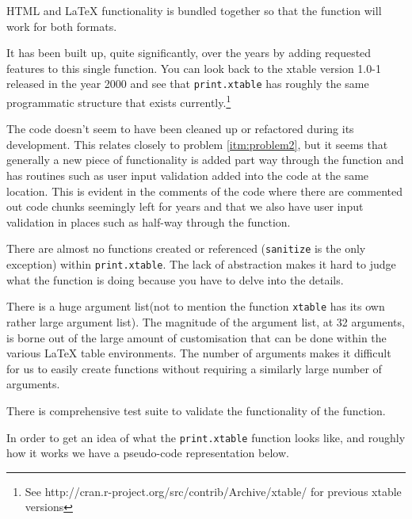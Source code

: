 \documentclass{memoir}\usepackage[]{graphicx}\usepackage[]{color}
\makeatletter
\def\namedlabel#1#2{\begingroup
    #2%
    \def\@currentlabel{#2}%
    \phantomsection\label{#1}\endgroup
}
\newcommand{\pkg}[1]{{\fontseries{b}\selectfont #1}}
\let\code=\texttt
\newcommand{\latex}{\LaTeX\xspace}
\makeatother
\begin{document}
\begin{description}[style=multiline, labelwidth=0.5cm]
    \item[\namedlabel{itm:problem1}{1}] HTML and \latex functionality is bundled together so that the function will work for both formats.
    \item[\namedlabel{itm:problem2}{2}] It has been built up, quite significantly, over the years by adding requested features to this single function. You can look back to the \pkg{xtable} version 1.0-1 released in the year 2000 and see that \code{print.xtable} has roughly the same programmatic structure that exists currently.\footnote{See http://cran.r-project.org/src/contrib/Archive/xtable/ for previous \pkg{xtable} versions}
    \item[\namedlabel{itm:problem3}{3}] The code doesn't seem to have been cleaned up or refactored during its development. This relates closely to problem \ref{itm:problem2}, but it seems that generally a new piece of functionality is added part way through the function and has routines such as user input validation added into the code at the same location. This is evident in the comments of the code where there are commented out code chunks seemingly left for years and that we also have user input validation in places such as half-way through the function.
    \item[\namedlabel{itm:problem4}{4}] There are almost no functions created or referenced (\code{sanitize} is the only exception) within \code{print.xtable}. The lack of abstraction makes it hard to judge what the function is doing because you have to delve into the details.
    \item[\namedlabel{itm:problem5}{5}] There is a huge argument list(not to mention the function \code{xtable} has its own rather large argument list). The magnitude of the argument list, at 32 arguments, is borne out of the large amount of customisation that can be done within the various \latex table environments. The number of arguments makes it difficult for us to easily create functions without requiring a similarly large number of arguments.
    \item[\namedlabel{item:problem6}{6}] There is comprehensive test suite to validate the functionality of the function.
\end{description}


In order to get an idea of what the \code{print.xtable} function looks like, and roughly how it works we have a pseudo-code representation below. 
\end{document}

